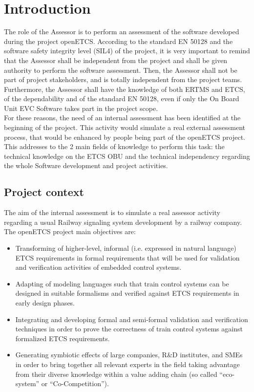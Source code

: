 \documentclass{template/openetcs_article}
\begin{document}
\section{Introduction}
The role of the Assessor is to perform an assessment of the software developed during the project openETCS. According to the standard EN 50128 and the software
safety integrity level (SIL4) of the project, it is very important to remind that the Assessor shall be independent from the project and shall be given
authority to perform the software assessment. Then, the Assessor shall not be part of project stakeholders, and is totally independent from the project teams.
Furthermore, the Assessor shall have the knowledge of both ERTMS and ETCS, of the dependability and of the standard EN 50128, even if only the On Board Unit EVC
Software takes part in the project scope.
\\
For these reasons, the need of an internal assessment has been identified at the beginning of the project. This activity would simulate a real external
assessment process, that would be enhanced by people being part of the openETCS project. This addresses to the 2 main fields of knowledge to perform this task:
the technical knowledge on the ETCS OBU and the technical independency regarding the whole Software development and project activities.

\subsection{Project context}
The aim of the internal assessment is to simulate a real assessor activity regarding a usual Railway signaling system development by a railway company. The openETCS project main objectives are:
\begin{itemize}
\item Transforming of higher-level, informal (i.e. expressed in natural language) ETCS requirements in formal requirements that will be used for
validation and verification activities of embedded control systems.
\item Adapting of modeling languages such that train control systems can be designed in suitable formalisms and verified against ETCS requirements in early
design phases.
\item Integrating and developing formal and semi-formal validation and verification techniques in order to prove the correctness of train control systems
against formalized ETCS requirements.
\item Generating symbiotic effects of large companies, R\&D institutes, and SMEs in order to bring together all relevant experts in the field taking advantage
from their diverse knowledge within a value adding chain (so called “eco-system” or “Co-Competition”).
\end{itemize}
\end{document}
